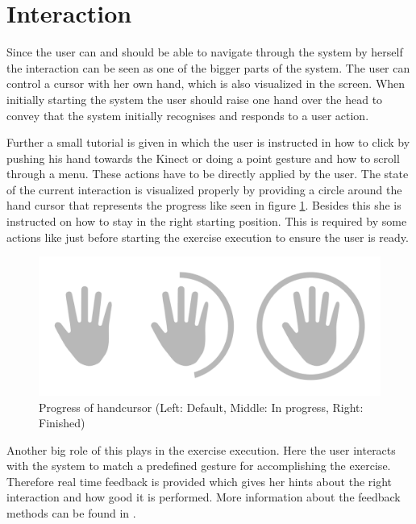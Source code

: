 \section{Interaction}\label{4_2_interaction}
Since the user can and should be able to navigate through the system by herself the interaction can be seen as one of the bigger parts of the system. The user can control a cursor with her own hand, which is also visualized in the screen. When initially starting the system the user should raise one hand over the head to convey that the system initially recognises and responds to a user action. 

Further a small tutorial is given in which the user is instructed in how to click by pushing his hand towards the Kinect or doing a point gesture and how to scroll through a menu. These actions have to be directly applied by the user. The state of the current interaction is visualized properly by providing a circle around the hand cursor that represents the progress like seen in figure \ref{fig:handcursorProgress}. Besides this she is instructed on how to stay in the right starting position. This is required by some actions like just before starting the exercise execution to ensure the user is ready.
\begin{figure}[htb]
	\centering
	\begin{minipage}[t]{1\linewidth}
		\centering
		\includegraphics[width=0.6\linewidth]{Pictures/handcursorProgress}
		\caption{Progress of handcursor (Left: Default, Middle: In progress, Right: Finished)}
		\label{fig:handcursorProgress}
	\end{minipage}
\end{figure}

Another big role of this plays in the exercise execution. Here the user interacts with the system to match a predefined gesture for accomplishing the exercise. Therefore real time feedback is provided which gives her hints about the right interaction and how good it is performed. More information about the feedback methods can be found in \textbf{}.

